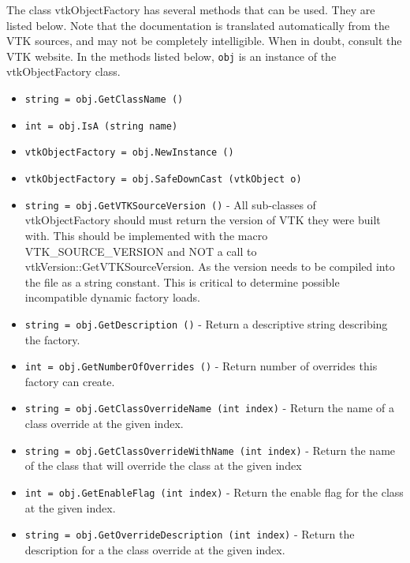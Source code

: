 The class vtkObjectFactory has several methods that can be used.
  They are listed below.
Note that the documentation is translated automatically from the VTK sources,
and may not be completely intelligible.  When in doubt, consult the VTK website.
In the methods listed below, \verb|obj| is an instance of the vtkObjectFactory class.
\begin{itemize}
\item  \verb|string = obj.GetClassName ()|

\item  \verb|int = obj.IsA (string name)|

\item  \verb|vtkObjectFactory = obj.NewInstance ()|

\item  \verb|vtkObjectFactory = obj.SafeDownCast (vtkObject o)|

\item  \verb|string = obj.GetVTKSourceVersion ()| -  All sub-classes of vtkObjectFactory should must return the version of 
 VTK they were built with.  This should be implemented with the macro
 VTK\_SOURCE\_VERSION and NOT a call to vtkVersion::GetVTKSourceVersion.
 As the version needs to be compiled into the file as a string constant.
 This is critical to determine possible incompatible dynamic factory loads.

\item  \verb|string = obj.GetDescription ()| -  Return a descriptive string describing the factory.

\item  \verb|int = obj.GetNumberOfOverrides ()| -  Return number of overrides this factory can create.

\item  \verb|string = obj.GetClassOverrideName (int index)| -  Return the name of a class override at the given index.

\item  \verb|string = obj.GetClassOverrideWithName (int index)| -  Return the name of the class that will override the class
 at the given index

\item  \verb|int = obj.GetEnableFlag (int index)| -  Return the enable flag for the class at the given index.

\item  \verb|string = obj.GetOverrideDescription (int index)| -  Return the description for a the class override at the given 
 index.


\end{itemize}
